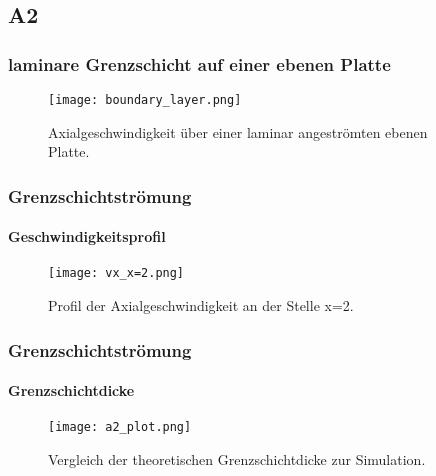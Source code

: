 \documentclass[
	11pt, %
	aspectratio=169, %
]{beamer}
\begin{document}
\subsection{A2}
\begin{frame}
	\frametitle{laminare Grenzschicht auf einer ebenen Platte}
	\begin{center}
		\begin{figure}
			\texttt{[image: boundary\_layer.png]}
			\caption{Axialgeschwindigkeit über einer laminar angeströmten ebenen Platte.}
		\end{figure}
	\end{center}
\end{frame}

\begin{frame}
	\frametitle{Grenzschichtströmung}
	\framesubtitle{Geschwindigkeitsprofil}
	\begin{center}
		\begin{figure}
			\texttt{[image: vx\_x=2.png]}
			\caption{Profil der Axialgeschwindigkeit an der Stelle x=2.}
		\end{figure}
	\end{center}
\end{frame}

\begin{frame}
	\frametitle{Grenzschichtströmung}
	\framesubtitle{Grenzschichtdicke}
	\begin{center}
		\begin{figure}
			\texttt{[image: a2\_plot.png]}
			\caption{Vergleich der theoretischen Grenzschichtdicke zur Simulation.}
		\end{figure}
	\end{center}
\end{frame}
\end{document}
